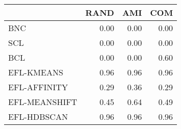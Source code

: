 \begin{tabular}{lrrr}
\toprule
 & RAND & AMI & COM \\
\midrule
BNC & 0.00 & 0.00 & 0.00 \\
SCL & 0.00 & 0.00 & 0.00 \\
BCL & 0.00 & 0.00 & 0.60 \\
EFL-KMEANS & 0.96 & 0.96 & 0.96 \\
EFL-AFFINITY & 0.29 & 0.36 & 0.29 \\
EFL-MEANSHIFT & 0.45 & 0.64 & 0.49 \\
EFL-HDBSCAN & 0.96 & 0.96 & 0.96 \\
\bottomrule
\end{tabular}
